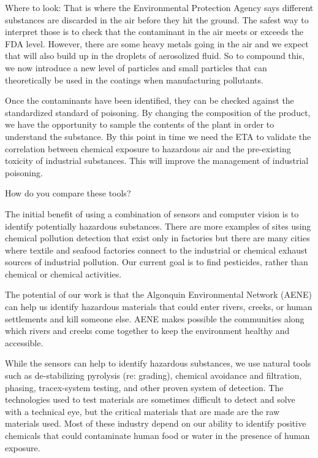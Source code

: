 \documentclass{article}
\begin{document}
Where to look: That is where the Environmental Protection Agency says different substances are discarded in the air before they hit the ground. The safest way to interpret those is to check that the contaminant in the air meets or exceeds the FDA level. However, there are some heavy metals going in the air and we expect that will also build up in the droplets of aerosolized fluid. So to compound this, we now introduce a new level of particles and small particles that can theoretically be used in the coatings when manufacturing pollutants.

Once the contaminants have been identified, they can be checked against the standardized standard of poisoning. By changing the composition of the product, we have the opportunity to sample the contents of the plant in order to understand the substance. By this point in time we need the ETA to validate the correlation between chemical exposure to hazardous air and the pre-existing toxicity of industrial substances. This will improve the management of industrial poisoning.

How do you compare these tools?

The initial benefit of using a combination of sensors and computer vision is to identify potentially hazardous substances. There are more examples of sites using chemical pollution detection that exist only in factories but there are many cities where textile and seafood factories connect to the industrial or chemical exhaust sources of industrial pollution. Our current goal is to find pesticides, rather than chemical or chemical activities.

The potential of our work is that the Algonquin Environmental Network (AENE) can help us identify hazardous materials that could enter rivers, creeks, or human settlements and kill someone else. AENE makes possible the communities along which rivers and creeks come together to keep the environment healthy and accessible.

While the sensors can help to identify hazardous substances, we use natural tools such as de-stabilizing pyrolysis (re: grading), chemical avoidance and filtration, phasing, tracex-system testing, and other proven system of detection. The technologies used to test materials are sometimes difficult to detect and solve with a technical eye, but the critical materials that are made are the raw materials used. Most of these industry depend on our ability to identify positive chemicals that could contaminate human food or water in the presence of human exposure.
\end{document}
